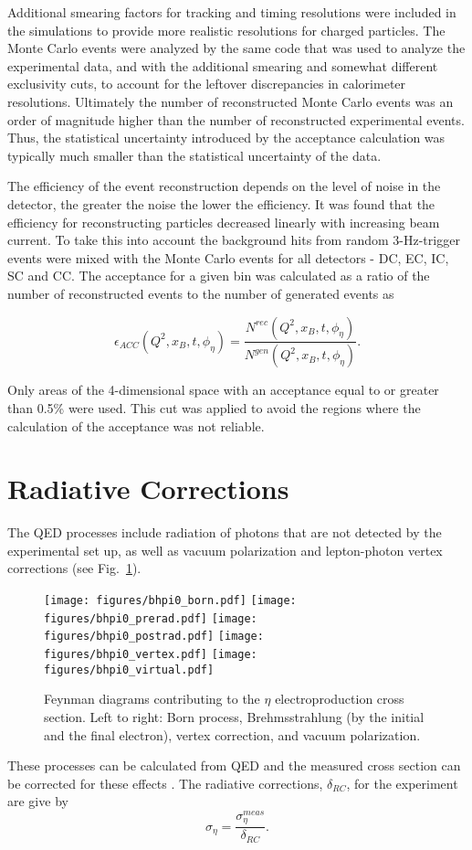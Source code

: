 \documentclass[prc,aps,floatfix,showpacs,showkeys,twocolumn,superscriptaddress,letterpaper,10pt]{revtex4-1}
\begin{document}
Additional smearing factors for tracking and timing resolutions were included in the simulations to provide more realistic resolutions for charged particles. The Monte Carlo events were analyzed by the same code that was used to analyze the experimental data, and with the additional smearing and somewhat different exclusivity cuts, to account for the leftover discrepancies in calorimeter resolutions. Ultimately the number of reconstructed Monte Carlo events  was an order of magnitude higher  than the number of reconstructed experimental events.  Thus, the statistical uncertainty introduced by the acceptance calculation was typically much smaller than the statistical uncertainty of the data.

The efficiency of the event reconstruction depends on the level of noise in the detector, the greater the noise the lower the efficiency. It was found that the efficiency for reconstructing particles decreased linearly with increasing beam current.
To take this into account the background hits from random 3-Hz-trigger events  were mixed with the Monte Carlo events for all detectors - DC, EC, IC, SC and CC.
The acceptance for a given bin  was calculated as a ratio of the number of reconstructed events to the number of generated events  as

\begin{equation}
\epsilon_{ACC}(Q^2,x_B,t,\phi_\eta)=\frac {N^{rec}(Q^2,x_B,t,\phi_\eta)}{N^{gen}(Q^2,x_B,t,\phi_\eta)}.
\end{equation}

\noindent
 Only areas of the 4-dimensional space with an acceptance equal to or greater than 0.5\% were used.
This cut was applied to avoid the regions where the calculation of the acceptance was not reliable. 
\section{Radiative Corrections}
\label{rccorrection}


The QED processes include radiation of  photons  that are not detected by  the experimental set up, as well as vacuum polarization 
and lepton-photon vertex corrections (see Fig.~\ref{fig:rad_proc}).
\begin{figure}
\texttt{[image: figures/bhpi0\_born.pdf]}
\texttt{[image: figures/bhpi0\_prerad.pdf]}
\texttt{[image: figures/bhpi0\_postrad.pdf]}
\texttt{[image: figures/bhpi0\_vertex.pdf]}
\texttt{[image: figures/bhpi0\_virtual.pdf]}
\caption{\label{fig:rad_proc}	
Feynman diagrams contributing to the $\eta$ electroproduction
cross section. Left to right: Born process,
Brehmsstrahlung (by the initial and the final electron),  vertex correction, and
vacuum polarization.}
\end{figure}
These processes can be calculated  from QED and the measured
cross section can be corrected for these effects \cite{Mo:1968cg}. The radiative corrections, $\delta_{RC}$, for the experiment are give by
\begin{equation}
	\sigma_{\eta} = \frac{\sigma_\eta^{meas}}{\delta_{RC}}.
\end{equation}
\end{document}
